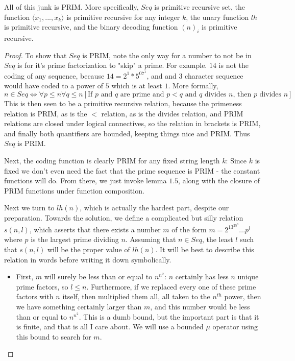 \begin{theorem}
    All of this junk is PRIM. More specifically, $Seq$ is primitive recursive set, the function $\langle x_1,...,x_k \rangle$ is primitive recursive for any integer $k$, the unary function $lh$ is primitive recursive, and the binary decoding function $(n)_i$ is primitive recursive. 
\end{theorem}
\begin{proof}
    To show that $Seq$ is PRIM, note the only way for a number to not be in $Seq$ is for it's prime factorization to "skip" a prime. For example. $14$ is not the coding of any sequence, because $14 = 2^1*5^07^1$, and and $3$ character sequence would have coded to a power of $5$ which is at least $1$. More formally, 
    \[ n \in Seq \iff \forall p \leq n \forall q \leq n [\textrm{If $p$ and $q$ are prime and $p < q$ and $q$ divides $n$, then $p$ divides $n$}] \]
    This is then seen to be a primitive recursive relation, because the primeness relation is PRIM, as is the $<$ relation, as is the divides relation, and PRIM relations are closed under logical connectives, so the relation in brackets is PRIM, and finally both quantifiers are bounded, keeping things nice and PRIM. Thus $Seq$ is PRIM.
    \par Next, the coding function is clearly PRIM for any fixed string length $k$: Since $k$ is fixed we don't even need the fact that the prime sequence is PRIM - the constant functions will do. From there, we just invoke lemma $1.5$, along with the closure of PRIM functions under function composition. 
    \par Next we turn to $lh(n)$, which is actually the hardest part, despite our preparation. Towards the solution, we define a complicated but silly relation $s(n,l)$, which asserts that there exists a number $m$ of the form $m = 2^13^25^3...p^l$ where $p$ is the largest prime dividing $n$. Assuming that $n \in Seq$, the least $l$ such that $s(n,l)$ will be the proper value of $lh(n)$. It will be best to describe this relation in words before writing it down symbolically. 
    \begin{itemize}
        \item First, $m$ will surely be less than or equal to $n^{n^2}$: $n$ certainly has less $n$ unique prime factors, so $l \leq n$. Furthermore, if we replaced every one of these prime factors with $n$ itself, then multiplied them all, all taken to the $n^{th}$ power, then we have something certainly larger than $m$, and this number would be less than or equal to $n^{n^2}$. This is a dumb bound, but the important part is that it is finite, and that is all I care about. We will use a bounded $\mu$ operator using this bound to search for $m$.

\end{itemize}
\end{proof}
